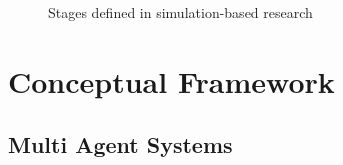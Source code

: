 \documentclass[11pt,oneside,a4paper,openright]{report}
\begin{document}
\begin{figure}[h]
\centering
\setlength\fboxsep{0pt}
\setlength\fboxrule{0.5pt}
\caption{Stages defined in simulation-based research \cite{RussellNorvig}}
\label{fig:SimStages}
\end{figure}







\section{Conceptual Framework}

\subsection{Multi Agent Systems} %


\end{document}
